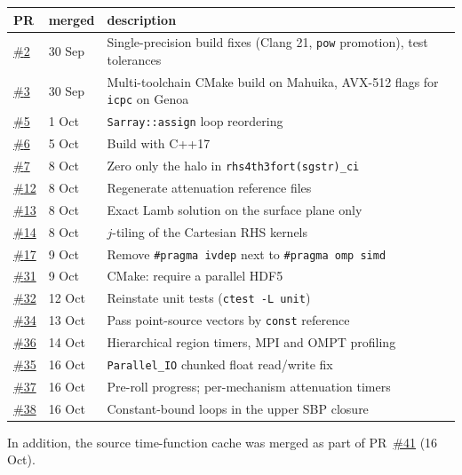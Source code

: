 \documentclass[11pt,a4paper]{article}
\newcommand{\pr}[1]{\href{https://github.com/ucgmsim/sw4/pull/#1}{\#{#1}}}
\newcommand{\code}[1]{\texttt{#1}}
\begin{document}
\begin{table}[ht]
  \centering
  \small
  \begin{tabularx}{\textwidth}{llX}
    \toprule
    PR & merged & description \\
    \midrule
    \pr{2}  & 30 Sep & Single-precision build fixes (Clang 21, \code{pow} promotion), test tolerances \\
    \pr{3}  & 30 Sep & Multi-toolchain CMake build on Mahuika, AVX-512 flags for \code{icpc} on Genoa \\
    \pr{5}  & 1 Oct  & \code{Sarray::assign} loop reordering \\
    \pr{6}  & 5 Oct  & Build with C++17 \\
    \pr{7}  & 8 Oct  & Zero only the halo in \code{rhs4th3fort(sgstr)\_ci} \\
    \pr{12} & 8 Oct  & Regenerate attenuation reference files \\
    \pr{13} & 8 Oct  & Exact Lamb solution on the surface plane only \\
    \pr{14} & 8 Oct  & $j$-tiling of the Cartesian RHS kernels \\
    \pr{17} & 9 Oct  & Remove \code{\#pragma ivdep} next to \code{\#pragma omp simd} \\
    \pr{31} & 9 Oct  & CMake: require a parallel HDF5 \\
    \pr{32} & 12 Oct & Reinstate unit tests (\code{ctest -L unit}) \\
    \pr{34} & 13 Oct & Pass point-source vectors by \code{const} reference \\
    \pr{36} & 14 Oct & Hierarchical region timers, MPI and OMPT profiling \\
    \pr{35} & 16 Oct & \code{Parallel\_IO} chunked float read/write fix \\
    \pr{37} & 16 Oct & Pre-roll progress; per-mechanism attenuation timers \\
    \pr{38} & 16 Oct & Constant-bound loops in the upper SBP closure \\
    \bottomrule
  \end{tabularx}
\end{table}
In addition, the source time-function cache was merged as part of
PR~\pr{41} (16 Oct).
\end{document}
